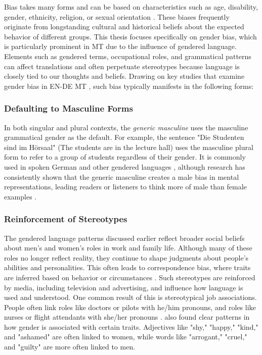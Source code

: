     Bias takes many forms and can be based on characteristics such as age, disability, gender, ethnicity, religion, or sexual orientation \parencite{ullmannGenderBiasMachine2022}. These biases frequently originate from longstanding cultural and historical beliefs about the expected behavior of different groups. This thesis focuses specifically on gender bias, which is particularly prominent in MT due to the influence of gendered language. Elements such as gendered terms, occupational roles, and grammatical patterns can affect translations and often perpetuate stereotypes because language is closely tied to our thoughts and beliefs. Drawing on key studies that examine gender bias in EN-DE MT \parencite{ullmannGenderBiasMachine2022,rescignoGenderBiasMachine2023,lardelliBuildingBridgesDataset2024,kapplAreAllSpanish2025}, such bias typically manifests in the following forms:

    \subsubsection{Defaulting to Masculine Forms}
        In both singular and plural contexts, the \textit{generic masculine} uses the masculine grammatical gender as the default.
        For example, the sentence "Die Studenten sind im Hörsaal" (The students are in the lecture hall) uses the masculine plural form to refer to a group of students regardless of their gender. It is commonly used in spoken German and other gendered languages \parencite{lardelliBuildingBridgesDataset2024,schmitzGermanAllProfessors2022}, although research has consistently shown that the generic masculine creates a male bias in mental representations, leading readers or listeners to think more of male than female examples \parencite{sczesnyCanGenderFairLanguage2016}. 

    \subsubsection{Reinforcement of Stereotypes}
        The gendered language patterns discussed earlier reflect broader social beliefs about men’s and women’s roles in work and family life. Although many of these roles no longer reflect reality, they continue to shape judgments about people’s abilities and personalities. This often leads to correspondence bias, where traits are inferred based on behavior or circumstances \parencite{godsilEffectsGenderRoles2016}. Such stereotypes are reinforced by media, including television and advertising, and influence how language is used and understood. One common result of this is stereotypical job associations. People often link roles like doctors or pilots with he/him pronouns, and roles like nurses or flight attendants with she/her pronouns \parencite{shresthaExploringGenderBiases2022}. \textcite{pratesAssessingGenderBias2019} also found clear patterns in how gender is associated with certain traits. Adjectives like "shy," "happy," "kind," and "ashamed" are often linked to women, while words like "arrogant," "cruel," and "guilty" are more often linked to men. 

